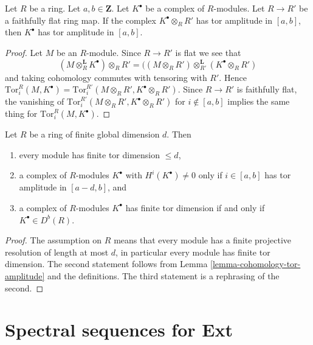 \begin{lemma}
\label{lemma-flat-descent-tor-amplitude}
Let $R$ be a ring. Let $a, b \in \mathbf{Z}$. Let $K^\bullet$
be a complex of $R$-modules. Let $R \to R'$ be a faithfully flat
ring map. If the complex $K^\bullet \otimes_R R'$ has tor amplitude
in $[a, b]$, then $K^\bullet$ has tor amplitude in $[a, b]$.
\end{lemma}

\begin{proof}
Let $M$ be an $R$-module. Since $R \to R'$ is flat we see that
$$
(M \otimes_R^{\mathbf{L}} K^\bullet) \otimes_R R'
=
((M \otimes_R R') \otimes_{R'}^{\mathbf{L}} (K^\bullet \otimes_R R')
$$
and taking cohomology commutes with tensoring with $R'$.
Hence $\text{Tor}_i^R(M, K^\bullet) =
\text{Tor}_i^{R'}(M \otimes_R R', K^\bullet \otimes_R R')$.
Since $R \to R'$ is faithfully flat, the vanishing of
$\text{Tor}_i^{R'}(M \otimes_R R', K^\bullet \otimes_R R')$ for
$i \not \in [a, b]$ implies the same thing for
$\text{Tor}_i^R(M, K^\bullet)$.
\end{proof}

\begin{lemma}
\label{lemma-finite-gl-dim-tor-dimension}
Let $R$ be a ring of finite global dimension $d$. Then
\begin{enumerate}
\item every module has finite tor dimension $\leq d$,
\item a complex of $R$-modules $K^\bullet$ with $H^i(K^\bullet) \not = 0$
only if $i \in [a, b]$ has tor amplitude in $[a - d, b]$, and
\item a complex of $R$-modules $K^\bullet$ has finite tor dimension if and only
if $K^\bullet \in D^b(R)$.
\end{enumerate}
\end{lemma}

\begin{proof}
The assumption on $R$ means that every module has a finite projective
resolution of length at most $d$, in particular every module has finite
tor dimension. The second statement follows from
Lemma \ref{lemma-cohomology-tor-amplitude}
and the definitions. The third statement is a rephrasing of the second.
\end{proof}






\section{Spectral sequences for Ext}
\label{section-spectral-sequence-ext}

